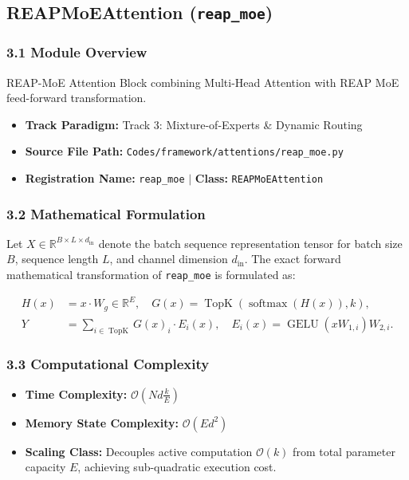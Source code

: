 \subsection{REAPMoEAttention (\texttt{reap\_moe})}
\label{sec:app_module_reap_moe}

\subsubsection*{3.1 Module Overview}
REAP-MoE Attention Block combining Multi-Head Attention with REAP MoE feed-forward transformation.
\begin{itemize}
    \item \textbf{Track Paradigm:} Track 3: Mixture-of-Experts & Dynamic Routing
    \item \textbf{Source File Path:} \texttt{Codes/framework/attentions/reap\_moe.py}
    \item \textbf{Registration Name:} \texttt{reap\_moe} $\mid$ \textbf{Class:} \texttt{REAPMoEAttention}
\end{itemize}

\subsubsection*{3.2 Mathematical Formulation}
Let $X \in \mathbb{R}^{B \times L \times d_{\text{in}}}$ denote the batch sequence representation tensor for batch size $B$, sequence length $L$, and channel dimension $d_{\text{in}}$. The exact forward mathematical transformation of \texttt{reap\_moe} is formulated as:

\begin{align}
H(x) &= x \cdot W_g \in \mathbb{R}^{E}, \quad G(x) = \operatorname{TopK}\left(\operatorname{softmax}(H(x)), k\right), \\
Y &= \sum_{i \in \operatorname{TopK}} G(x)_i \cdot E_i(x), \quad E_i(x) = \operatorname{GELU}(x W_{1, i}) W_{2, i}.
\end{align}


\subsubsection*{3.3 Computational Complexity}
\begin{itemize}
    \item \textbf{Time Complexity:} $\mathcal{O}(N d \frac{k}{E})$
    \item \textbf{Memory State Complexity:} $\mathcal{O}(E d^2)$
    \item \textbf{Scaling Class:} Decouples active computation $\mathcal{O}(k)$ from total parameter capacity $E$, achieving sub-quadratic execution cost.
\end{itemize}

